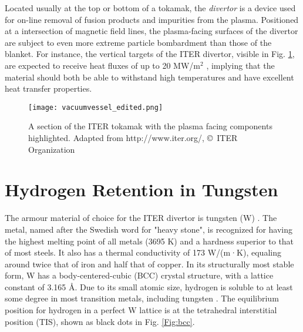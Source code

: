 Located usually at the top or bottom of a tokamak, the \textit{divertor} is a device used for on-line removal of fusion products and impurities from the plasma.
Positioned at a intersection of magnetic field lines, the plasma-facing surfaces of the divertor are subject to even more extreme particle bombardment than those of the blanket.
For instance, the vertical targets of the ITER divertor, visible in Fig. \ref{fig:ITERslice}, are expected to receive heat fluxes of up to 20 MW/m$^2$ \cite{Iter1234Divertor}, implying that the material should both be able to withstand high temperatures and have excellent heat transfer properties.

\vspace{35mm}
\begin{figure}[!ht]
\center
\texttt{[image: vacuumvessel\_edited.png]}
\caption{A section of the ITER tokamak with the plasma facing components highlighted. Adapted from http://www.iter.org/, \copyright~ITER Organization}
\label{fig:ITERslice}
\end{figure}

\section{Hydrogen Retention in Tungsten}
The armour material of choice for the ITER divertor is tungsten (W) \cite{PITTS2013S48}.
The metal, named after the Swedish word for "heavy stone", is recognized for having the highest melting point of all metals (3695 K) and a hardness superior to that of most steels. 
It also has a thermal conductivity of 173 W/(m·K), equaling around twice that of iron and half that of copper. 
In its structurally most stable form, W has a body-centered-cubic (BCC) crystal structure, with a lattice constant of 3.165 \AA.
Due to its small atomic size, hydrogen is soluble to at least some degree in most transition metals, including tungsten \cite{smith1934occlusion, frauenfelder1969solution}.
The equilibrium position for hydrogen in a perfect W lattice is at the tetrahedral interstitial position (TIS), shown as black dots in Fig. \ref{Fig:bcc}. 

